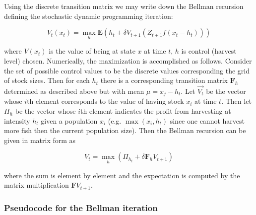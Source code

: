 \documentclass[author-year, review]{elsarticle} %
\newenvironment{Shaded}{}{}
\newcommand{\KeywordTok}[1]{\textcolor[rgb]{0.00,0.44,0.13}{\textbf{{#1}}}}
\newcommand{\DataTypeTok}[1]{\textcolor[rgb]{0.56,0.13,0.00}{{#1}}}
\newcommand{\DecValTok}[1]{\textcolor[rgb]{0.25,0.63,0.44}{{#1}}}
\newcommand{\CommentTok}[1]{\textcolor[rgb]{0.38,0.63,0.69}{\textit{{#1}}}}
\newcommand{\NormalTok}[1]{{#1}}
\begin{document}
Using the discrete transition matrix we may write down the Bellman
recursion defining the stochastic dynamic programming iteration:

\begin{equation}
V_t(x_t) = \max_h \mathbf{E} \left( h_t + \delta V_{t+1}( Z_{t+1} f(x_t - h_t)) \right)
\end{equation}

where $V(x_t)$ is the value of being at state $x$ at time $t$, $h$ is
control (harvest level) chosen. Numerically, the maximization is
accomplished as follows. Consider the set of possible control values to
be the discrete values corresponding the grid of stock sizes. Then for
each $h_t$ there is a corresponding transition matrix $\mathbf{F}_h$
determined as described above but with mean $\mu = x_j - h_t$. Let
$\vec{V_t}$ be the vector whose $i$th element corresponds to the value
of having stock $x_i$ at time $t$. Then let $\Pi_h$ be the vector whose
$i$th element indicates the profit from harvesting at intensity $h_t$
given a population $x_i$ (e.g. $\max(x_i, h_t)$ since one cannot harvest
more fish then the current population size). Then the Bellman recursion
can be given in matrix form as

\[V_{t} = \max_h \left( \Pi_{h_{t}} + \delta \mathbf{F}_h V_{t+1} \right)\]

where the sum is element by element and the expectation is computed by
the matrix multiplication $\mathbf{F} V_{t+1}$.

\subsubsection{Pseudocode for the Bellman iteration}

\begin{Shaded}
\end{Shaded}
\end{document}

